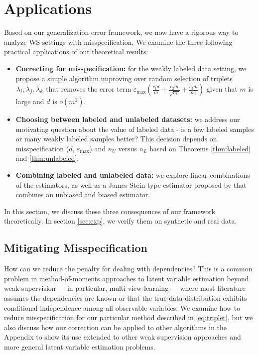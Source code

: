 \section{Applications}

Based on our generalization error framework, we now have a rigorous way to analyze WS settings with misspecification. We examine the three following practical applications of our theoretical results:
\begin{itemize}
    \item \textbf{Correcting for misspecification:} for the weakly labeled data setting, we propose a simple algorithm improving over random selection of triplets $\lambda_i, \lambda_j, \lambda_k$ that removes the error term $\varepsilon_{\max} \left(\frac{c_1 d}{m} + \frac{c_2 m}{\sqrt{n_U}} + \frac{c_3 m}{n_U}\right)$ given that $m$ is large and $d$ is $o(m^2)$.
    \item \textbf{Choosing between labeled and unlabeled datasets:} we address our motivating question about the value of labeled data - is a few labeled samples or many weakly labeled samples better? This decision depends on misspecification ($d$, $\varepsilon_{\max}$) and $n_U$ versus $n_L$ based on Theorems \ref{thm:labeled} and \ref{thm:unlabeled}.
    \item \textbf{Combining labeled and unlabeled data:} we explore linear combinations of the estimators, as well as a James-Stein type estimator proposed by \cite{GreenStrawderman1991} that combines an unbiased and biased estimator. %
\end{itemize}

In this section, we discuss these three consequences of our framework theoretically. In section \ref{sec:exp}, we verify them on synthetic and real data.

\subsection{Mitigating Misspecification}
How can we reduce the penalty for dealing with dependencies? This is a common problem in method-of-moments approaches to latent variable estimation beyond weak supervision \cite{anandkumar12, chaganty14} --- in particular, multi-view learning --- where most literature assumes the dependencies are known or that the true data distribution exhibits conditional independence among all observable variables. We examine how to reduce misspecification for our particular method described in \eqref{eq:triplet}, but we also discuss how our correction can be applied to other algorithms in the Appendix to show its use extended to other weak supervision approaches and more general latent variable estimation problems.

